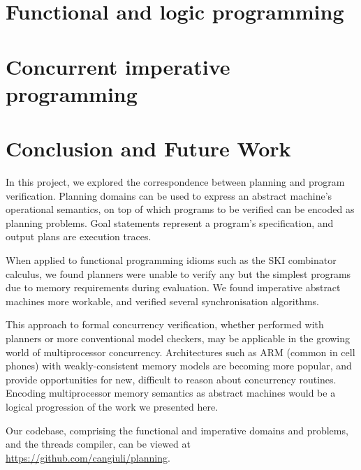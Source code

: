 \documentclass{article}
\begin{document}
\section{Functional and logic programming}



\section{Concurrent imperative programming}



\section{Conclusion and Future Work}

In this project, we explored the correspondence between planning and program verification. Planning domains can be used to express an abstract machine's operational semantics, on top of which programs to be verified can be encoded as planning problems. Goal statements represent a program's specification, and output plans are execution traces.

When applied to functional programming idioms such as the SKI combinator calculus, we found planners were unable to verify any but the simplest programs due to memory requirements during evaluation. We found imperative abstract machines more workable, and verified several synchronisation algorithms.

This approach to formal concurrency verification, whether performed with planners or more conventional model checkers, may be applicable in the growing world of multiprocessor concurrency. Architectures such as ARM (common in cell phones) with weakly-consistent memory models are becoming more popular, and provide opportunities for new, difficult to reason about concurrency routines. Encoding multiprocessor memory semantics as abstract machines would be a logical progression of the work we presented here.

Our codebase, comprising the functional and imperative domains and problems, and the threads compiler, can be viewed at \url{https://github.com/cangiuli/planning}.

{}

\end{document}
